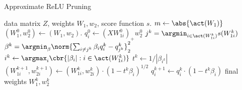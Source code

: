 \begin{algorithm}[tb]
	\caption{Approximate ReLU Pruning}
	\label{alg:pruning-solutions-nn}
	\begin{algorithmic}
		 data matrix \( Z \), weights \( W_{1}, w_{2} \),
		score function \( s \).
		\STATE \( m \gets \abs{\act(W_1)} \)
		\STATE \( (W_1^0, w_2^0) \gets (W_{1}, w_2) \).
		\STATE \( q^0_i \gets (X W^0_{1i})_+ w^0_2 \)
		\STATE \( j^k = \argmin_{i \in \act(W_{1i}^k)} s(W_{1i}^k) \)
		\STATE \( \beta^k = \argmin_{\beta} \norm{ \sum_{i \neq j^k} \beta_{i} q^k_i - q_{j^k}^k}_2^2 \)
		\STATE \( i^k \gets \argmax_{i} \cbr{|\beta_i| : i \in \act(W_{1i}^k)}  \)
		\STATE \( t^k \gets 1/|\beta_{i^k}| \)
		\STATE \( (W_{1i}^{k+1}, w_{2i}^{k+1}) \gets (W_{1i}^k, w_{2i}^k)
		\cdot (1 - t^k \beta_i)^{1/2} \)
		\STATE \( q^{k+1}_i \gets q_i^{k} \cdot (1 - t^k \beta_i) \)
		\ENDFOR
		 final weights \( W_1^k, w_2^k \)
	\end{algorithmic}
\end{algorithm}

